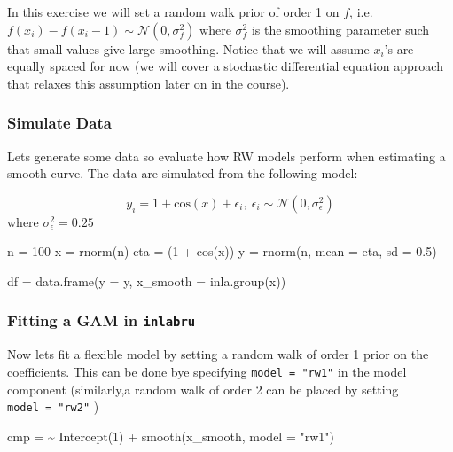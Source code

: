 \documentclass[
  letterpaper,
  DIV=11,
  numbers=noendperiod]{scrartcl}
\newenvironment{Shaded}{\begin{snugshade}}{\end{snugshade}}
\newcommand{\AttributeTok}[1]{\textcolor[rgb]{0.40,0.45,0.13}{#1}}
\newcommand{\DecValTok}[1]{\textcolor[rgb]{0.68,0.00,0.00}{#1}}
\newcommand{\ErrorTok}[1]{\textcolor[rgb]{0.68,0.00,0.00}{#1}}
\newcommand{\FloatTok}[1]{\textcolor[rgb]{0.68,0.00,0.00}{#1}}
\newcommand{\FunctionTok}[1]{\textcolor[rgb]{0.28,0.35,0.67}{#1}}
\newcommand{\NormalTok}[1]{\textcolor[rgb]{0.00,0.23,0.31}{#1}}
\newcommand{\OtherTok}[1]{\textcolor[rgb]{0.00,0.23,0.31}{#1}}
\newcommand{\SpecialCharTok}[1]{\textcolor[rgb]{0.37,0.37,0.37}{#1}}
\newcommand{\StringTok}[1]{\textcolor[rgb]{0.13,0.47,0.30}{#1}}
\begin{document}
In this exercise we will set a random walk prior of order 1 on \(f\),
i.e.~\(f(x_i)-f(x_i-1) \sim \mathcal{N}(0,\sigma^2_f)\) where
\(\sigma_f^2\) is the smoothing parameter such that small values give
large smoothing. Notice that we will assume \(x_i\)'s are equally spaced
for now (we will cover a stochastic differential equation approach that
relaxes this assumption later on in the course).

\subsubsection{Simulate Data}\label{simulate-data}

Lets generate some data so evaluate how RW models perform when
estimating a smooth curve. The data are simulated from the following
model:

\[
y_i = 1 + \mathrm{cos}(x) + \epsilon_i, ~ \epsilon_i \sim \mathcal{N}(0,\sigma^2_\epsilon)
\] where \(\sigma_\epsilon^2 = 0.25\)

\begin{Shaded}
\begin{Highlighting}[]
\NormalTok{n }\OtherTok{=} \DecValTok{100}
\NormalTok{x }\OtherTok{=} \FunctionTok{rnorm}\NormalTok{(n)}
\NormalTok{eta }\OtherTok{=}\NormalTok{ (}\DecValTok{1} \SpecialCharTok{+} \FunctionTok{cos}\NormalTok{(x))}
\NormalTok{y }\OtherTok{=} \FunctionTok{rnorm}\NormalTok{(n, }\AttributeTok{mean =}\NormalTok{  eta, }\AttributeTok{sd =} \FloatTok{0.5}\NormalTok{)}

\NormalTok{df }\OtherTok{=} \FunctionTok{data.frame}\NormalTok{(}\AttributeTok{y =}\NormalTok{ y, }
                \AttributeTok{x\_smooth =} \FunctionTok{inla.group}\NormalTok{(x))  }
\end{Highlighting}
\end{Shaded}

\subsubsection{\texorpdfstring{Fitting a GAM in
\texttt{inlabru}}{Fitting a GAM in inlabru}}\label{fitting-a-gam-in-inlabru}

Now lets fit a flexible model by setting a random walk of order 1 prior
on the coefficients. This can be done bye specifying
\texttt{model\ =\ "rw1"} in the model component (similarly,a random walk
of order 2 can be placed by setting \texttt{model\ =\ "rw2"} )

\begin{Shaded}
\begin{Highlighting}[]
\NormalTok{cmp }\OtherTok{=}  \ErrorTok{\textasciitilde{}} \FunctionTok{Intercept}\NormalTok{(}\DecValTok{1}\NormalTok{) }\SpecialCharTok{+} 
  \FunctionTok{smooth}\NormalTok{(x\_smooth, }\AttributeTok{model =} \StringTok{"rw1"}\NormalTok{)}
\end{Highlighting}
\end{Shaded}
\end{document}
